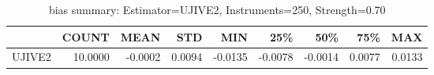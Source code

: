 \begin{table}[ht]
\centering
\caption{bias summary: Estimator=UJIVE2, Instruments=250, Strength=0.70}
\begin{tabular}{lrrrrrrrr}
\toprule
 & COUNT & MEAN & STD & MIN & 25\% & 50\% & 75\% & MAX \\
\midrule
UJIVE2 & 10.0000 & -0.0002 & 0.0094 & -0.0135 & -0.0078 & -0.0014 & 0.0077 & 0.0133 \\
\bottomrule
\end{tabular}
\end{table}
